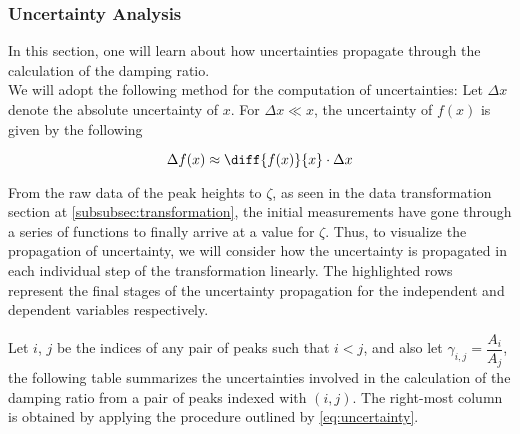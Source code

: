 \documentclass[a4paper,12pt]{article}
\newcommand{\lb}{\\[8pt]}
\begin{document}
\pagebreak

\subsubsection{Uncertainty Analysis}

In this section, one will learn about how uncertainties propagate through the calculation of the damping ratio.\lb
We will adopt the following method for the computation of uncertainties: Let $\Delta x$ denote the absolute uncertainty of $x$. For $\Delta x \ll x$, the uncertainty of $f(x)$ is given by the following \parencite{vacher_2001_the}

\begin{equation}\label{eq:uncertainty}
  \Delta f(x) \approx \diff{f(x)}{x}\cdot \Delta x
\end{equation}

From the raw data of the peak heights to $\zeta$, as seen in the data transformation section at \cref{subsubsec:transformation}, the initial measurements have gone through a series of functions to finally arrive at a value for $\zeta$. Thus, to visualize the propagation of uncertainty, we will consider how the uncertainty is propagated in each individual step of the transformation linearly. The highlighted rows represent the final stages of the uncertainty propagation for the independent and dependent variables respectively.


Let $i$, $j$ be the indices of any pair of peaks such that $i < j$, and also let $\gamma_{i, j} = \dfrac{A_i}{A_{j}}$, the following table summarizes the uncertainties involved in the calculation of the damping ratio from a pair of peaks indexed with $(i, j)$. The right-most column is obtained by applying the procedure outlined by \cref{eq:uncertainty}.
\end{document}
